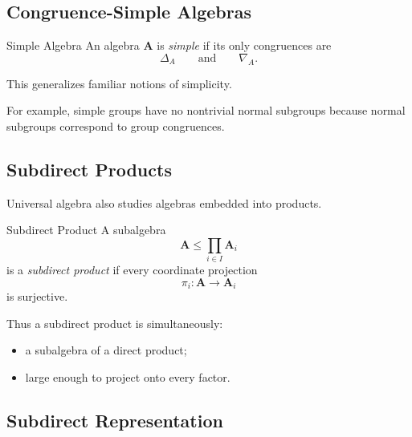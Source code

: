 \subsection{Congruence-Simple Algebras}
\label{subsec:congruence-simple}

\begin{definitionbox}{Simple Algebra}
An algebra \(\mathbf A\) is \emph{simple} if its only congruences are
\[ \Delta_A\qquad\text{and}\qquad\nabla_A. \]
\end{definitionbox}

This generalizes familiar notions of simplicity.

For example, simple groups have no nontrivial normal subgroups because
normal subgroups correspond to group congruences.

\subsection{Subdirect Products}
\label{subsec:subdirect-products}

Universal algebra also studies algebras embedded into products.

\begin{definitionbox}{Subdirect Product}
A subalgebra
\[ \mathbf A\leq\prod_{i\in I}\mathbf A_i \]
is a \emph{subdirect product} if every coordinate projection
\[ \pi_i:\mathbf A\to\mathbf A_i \]
is surjective.
\end{definitionbox}

Thus a subdirect product is simultaneously:

\begin{itemize}
    \item a subalgebra of a direct product;
    \item large enough to project onto every factor.
\end{itemize}

\subsection{Subdirect Representation}
\label{subsec:subdirect-representation}

